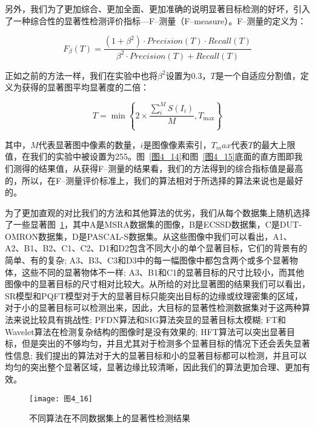 另外，我们为了更加综合、更加全面、更加准确的说明显著目标检测的好坏，引入了一种综合性的显著性检测评价指标---F--测量（F--measure）。F--测量的定义为：
\begin{linenomath}
\begin{equation}
F_{\beta}(T)=\frac{(1+\beta^{2})\cdot Precision(T)\cdot Recall(T)}{\beta^{2}\cdot Precision(T)+Recall(T)}
\label{式4_29}
\end{equation}
\end{linenomath}
正如之前的方法\cite{}一样，我们在实验中也将$\beta^{2}$设置为0.3，$T$是一个自适应分割值，定义为获得的显著图平均显著度的二倍：
\begin{linenomath}
\begin{equation}
T=\min\left\{2\times \frac{\sum^{M}_{i}S(I_{i})}{M},T_{\max}\right\}
\label{式4_30}
\end{equation}
\end{linenomath}
其中，$M$代表显著图中像素的数量，$i$是图像像素索引，$T_max$代表$T$的最大上限值，在我们的实验中被设置为255。图~\ref{图4_14}和图~\ref{图4_15}底面的直方图即我们测得的结果值，从获得F--测量的结果看，我们的方法得到的综合指标值是最高的，所以，在F--测量评价标准上，我们的算法相对于所选择的算法来说也是最好的。

为了更加直观的对比我们的方法和其他算法的优劣，我们从每个数据集上随机选择了一些显著图~\ref{图4_16}，其中A是MSRA数据集\cite{LiuTieCVPR2007Learning}的图像，B是ECSSD数据集\cite{YanQiongCVPR2013Hierarchical}，C是DUT-OMRON数据集\cite{YangChuanCVPR2013Manifold}，D是PASCAL-S数据集\cite{LiYinCVPR2014Secrets}。从这些图像中我们可以看出，A1、A2、B1、B2、C1、C2、D1和D2包含不同大小的单个显著目标，它们的背景有的简单、有的复杂; A3、B3、C3和D3中的每一幅图像中都包含两个或多个显著物体，这些不同的显著物体不一样; A3、B1和C1的显著目标的尺寸比较小，而其他图像中的显著目标的尺寸相对比较大。从所给的对比显著图的结果我们可以看出，SR模型\cite{HouXiaodiCVPR2007Residual}和PQFT模型\cite{GuoChenleiCVPR2008Spatio}对于大的显著目标只能突出目标的边缘或纹理密集的区域，对于小的显著目标可以检测出来，因此，大目标的显著性检测数据集对于这两种算法来说比较具有挑战性; PFDN算法\cite{BianCognNeurodyn2010Visual}和SIG算法\cite{HouXiaodiTPAMI2012Signature}突显的显著目标太模糊; FT\cite{AchantaCVPR2009Frequency}和Wavelet算法\cite{ImamogluTMM2013wavelet}在检测复杂结构的图像时是没有效果的; HFT算法\cite{LiJianTPAMI2013Scale}可以突出显著目标，但是突出的不够均匀，并且尤其对于检测多个显著目标的情况下还会丢失显著性信息; 我们提出的算法对于大的显著目标和小的显著目标都可以检测，并且可以均匀的突出整个显著区域，显著边缘比较清晰，因此我们的算法更加合理、更加有效。
\begin{figure}[h]
  \centering
  \texttt{[image: 图4\_16]}
  \caption{不同算法在不同数据集上的显著性检测结果}   
  \label{图4_16} 
\end{figure}

